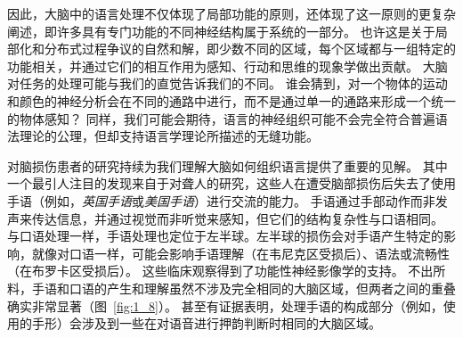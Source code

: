 因此，大脑中的语言处理不仅体现了局部功能的原则，还体现了这一原则的更复杂阐述，即许多具有专门功能的不同神经结构属于系统的一部分。
也许这是关于局部化和分布式过程争议的自然和解，即少数不同的区域，每个区域都与一组特定的功能相关，并通过它们的相互作用为感知、行动和思维的现象学做出贡献。
大脑对任务的处理可能与我们的直觉告诉我们的不同。
谁会猜到，对一个物体的运动和颜色的神经分析会在不同的通路中进行，而不是通过单一的通路来形成一个统一的物体感知？
同样，我们可能会期待，语言的神经组织可能不会完全符合普遍语法理论的公理，但却支持语言学理论所描述的无缝功能。




对脑损伤患者的研究持续为我们理解大脑如何组织语言提供了重要的见解。
其中一个最引人注目的发现来自于对聋人的研究，这些人在遭受脑部损伤后失去了使用手语（例如，\textit{英国手语}或\textit{美国手语}）进行交流的能力。
手语通过手部动作而非发声来传达信息，并通过视觉而非听觉来感知，但它们的结构复杂性与口语相同。
与口语处理一样，手语处理也定位于左半球。左半球的损伤会对手语产生特定的影响，就像对口语一样，可能会影响手语理解（在韦尼克区受损后）、语法或流畅性（在布罗卡区受损后）。
这些临床观察得到了功能性神经影像学的支持。
不出所料，手语和口语的产生和理解虽然不涉及完全相同的大脑区域，但两者之间的重叠确实非常显著（图~\ref{fig:1_8}）。
甚至有证据表明，处理手语的构成部分（例如，使用的手形）会涉及到一些在对语音进行押韵判断时相同的大脑区域。



